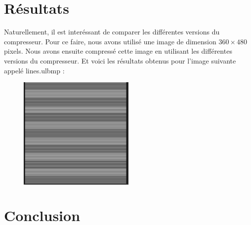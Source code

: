 \documentclass[utf8]{article}
\begin{document}
\section{Résultats}
Naturellement, il est interéssant de comparer les différentes versions du compresseur. Pour ce faire, nous avons utilisé une image de dimension $360 \times 480$ pixels. Nous avons ensuite compressé cette image en utilisant les différentes versions du compresseur. Et voici les résultats obtenus pour l'image suivante appelé lines.ulbmp : 
\begin{figure}[H]
\centering
\includegraphics[width=0.5\textwidth]{linesULBMP}
\label{fig:lines}
\end{figure}


\section{Conclusion}
\end{document}
